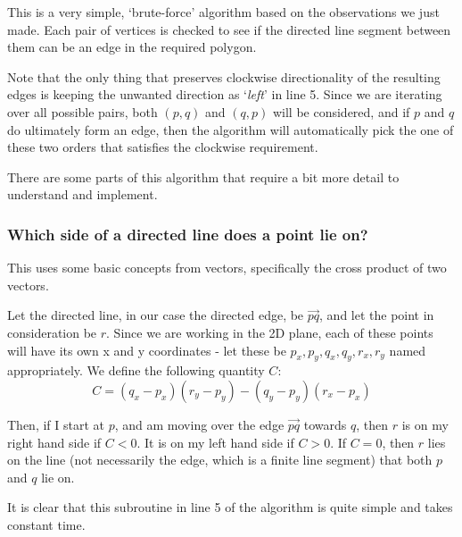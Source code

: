 \documentclass{article}
\begin{document}
This is a very simple, `brute-force' algorithm based on the observations we just made. Each pair of vertices is checked to see if the directed line segment between them can be an edge in the required polygon. 

Note that the only thing that preserves clockwise directionality of the resulting edges is keeping the unwanted direction as `\emph{left}' in line 5. Since we are iterating over all possible pairs, both $(p,q)$ and $(q,p)$ will be considered, and if $p$ and $q$ do ultimately form an edge, then the algorithm will automatically pick the one of these two orders that satisfies the clockwise requirement.

There are some parts of this algorithm that require a bit more detail to understand and implement.

\subsubsection{Which side of a directed line does a point lie on?}

This uses some basic concepts from vectors, specifically the cross product of two vectors. 

Let the directed line, in our case the directed edge, be $\overrightarrow{pq}$, and let the point in consideration be $r$. Since we are working in the 2D plane, each of these points will have its own x and y coordinates - let these be $p_x, p_y, q_x, q_y, r_x, r_y$ named appropriately. We define the following quantity $C$:
\begin{equation*}
    C = (q_x - p_x)(r_y - p_y) - (q_y - p_y)(r_x - p_x)
\end{equation*}

Then, if I start at $p$, and am moving over the edge $\overrightarrow{pq}$ towards $q$, then $r$ is on my right hand side if $C<0$. It is on my left hand side if $C>0$. If $C=0$, then $r$ lies on the line (not necessarily the edge, which is a finite line segment) that both $p$ and $q$ lie on.

It is clear that this subroutine in line 5 of the algorithm is quite simple and takes constant time.
\end{document}
